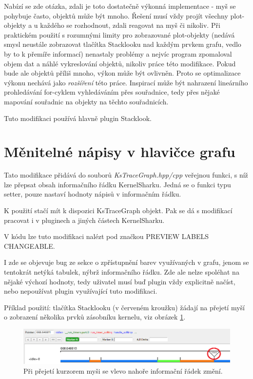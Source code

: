 Nabízí se zde otázka, zdali je toto dostatečně výkonná implementace - myš se pohybuje často, objektů může být mnoho. Řešení musí vždy projít všechny plot-objekty a u každého se rozhodnout, zdali reagovat na myš či nikoliv. Při praktickém použití s rozumnými limity pro zobrazované plot-objekty (nedává smysl neustále zobrazovat tlačítka Stacklooku nad každým prvkem grafu, vedlo by to k přemíře informací) nenastaly problémy a nejvíc program zpomaloval objem dat a náhlé vykreslování objektů, nikoliv práce této modifikace. Pokud bude ale objektů příliš mnoho, výkon může být ovlivněn. Proto se optimalizace výkonu nechává jako \emph{rozšíření} této práce. Inspirací může být nahrazení lineárního prohledávání for-cyklem vyhledáváním přes souřadnice, tedy přes nějaké mapování souřadnic na objekty na těchto souřadnicích.

Tuto modifikaci používá hlavně plugin Stacklook.

\section{Měnitelné nápisy v hlavičce grafu}

Tato modifikace přidává do souborů \emph{KsTraceGraph.hpp/cpp} veřejnou funkci, s níž lze přepsat obsah informačního řádku KernelSharku. Jedná se o funkci typu setter, pouze nastaví hodnoty nápisů v informačním řádku.

K použití stačí mít k dispozici KsTraceGraph objekt. Pak se dá s modifikací pracovat i v pluginech a jiných částech KernelSharku.

V kódu lze tuto modifikaci nalézt pod značkou PREVIEW LABELS CHANGEABLE.

I zde se objevuje bug ze sekce o zpřístupnění barev využívaných v grafu, jenom se tentokrát netýká tabulek, nýbrž informačního řádku. Zde ale nelze spoléhat na nějaké výchozí hodnoty, tedy uživatel musí buď plugin vždy explicitně načíst, nebo nepoužívat plugin využívající tuto modifikaci.

Příklad použití: tlačítka Stacklooku (v červeném kroužku) žádají na přejetí myší o zobrazení několika prvků zásobníku kernelu, viz obrázek \ref{obr02:modif-preview-labels-changeable}.

\begin{figure}[p]\centering
    \includegraphics[width=140mm]{img/Modifikace/modif-preview-labels-changeable.png}
    \caption{Při přejetí kurzorem myši se vlevo nahoře informační řádek změní.}
    \label{obr02:modif-preview-labels-changeable}
\end{figure}

